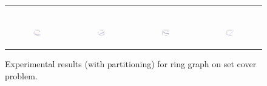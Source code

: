 \begin{figure}[ht]
\begin{tabular}{cccc}
\begin{subfigure}[h]{0.22\textwidth}
	  \end{subfigure} \\
	  \begin{subfigure}[h]{0.22\textwidth}
	  	\includegraphics[width=110pt]{images_partition/runtime_ring_maxgraphcut.eps}
			\caption{}
			\label{appfig:partition:runtime_ring_maxgraphcut}
	  \end{subfigure} &
	  \begin{subfigure}[h]{0.22\textwidth}
	  	\includegraphics[width=110pt]{images_partition/speedup_ring_maxgraphcut.eps}
			\caption{}
			\label{appfig:partition:speedup_ring_maxgraphcut}
	  \end{subfigure} &
	  \begin{subfigure}[h]{0.22\textwidth}
	  	\includegraphics[width=110pt]{images_partition/diffFA_CF2G_ring_maxgraphcut.eps}
			\caption{}
			\label{appfig:partition:diffFA_CF2G_ring_maxgraphcut}
	  \end{subfigure} &
	  \begin{subfigure}[h]{0.22\textwidth}
	  	\includegraphics[width=110pt]{images_partition/validated_CC2G_ring_maxgraphcut.eps}
			\caption{}
			\label{appfig:partition:validated_CC2G_ring_maxgraphcut.eps}
	  \end{subfigure} \\
  \end{tabular}
  \caption{\footnotesize Experimental results (with partitioning) for ring graph on set cover problem.}
\label{appfig:partition:results_adversarial}
\end{figure}

~
